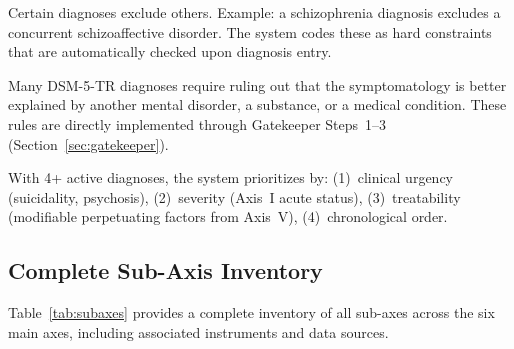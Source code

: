 \documentclass[11pt,a4paper]{article}
\begin{document}
\begin{description}[style=nextline, leftmargin=1.5cm, font=\bfseries]
\item[Hierarchical Exclusion Rules] Certain diagnoses exclude others. Example: a schizophrenia diagnosis excludes a concurrent schizoaffective disorder. The system codes these as hard constraints that are automatically checked upon diagnosis entry.
\item[``Due to Another Condition'' Rules] Many DSM-5-TR diagnoses require ruling out that the symptomatology is better explained by another mental disorder, a substance, or a medical condition. These rules are directly implemented through Gatekeeper Steps~1--3 (Section~\ref{sec:gatekeeper}).
\item[Permitted Comorbidities with Prioritization] With 4+ active diagnoses, the system prioritizes by: (1)~clinical urgency (suicidality, psychosis), (2)~severity (Axis~I acute status), (3)~treatability (modifiable perpetuating factors from Axis~V), (4)~chronological order.
\end{description}

\subsection{Complete Sub-Axis Inventory}

Table~\ref{tab:subaxes} provides a complete inventory of all sub-axes across the six main axes, including associated instruments and data sources.
\end{document}
